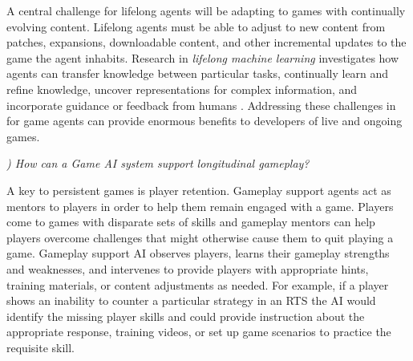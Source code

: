 \documentclass[conference]{IEEEtran}
\newcounter{questionno}
\newcommand{\subsubsectionx}[1]{{\em {\arabic{questionno}) #1}}
	\addtocounter{questionno}{1}
	}
\begin{document}

A central challenge for lifelong agents will be adapting to games with continually evolving content. 
Lifelong agents must be able to adjust to new content from patches, expansions, downloadable content, and other incremental updates to the game the agent inhabits.
Research in {\em lifelong machine learning} investigates how agents can transfer knowledge between particular tasks, continually learn and refine knowledge, uncover representations for complex information, and incorporate guidance or feedback from humans \cite{silver2013:lifelong-ml}.
Addressing these challenges in for game agents can provide enormous benefits to developers of live and ongoing games.


\subsubsectionx{How can a Game AI system support longitudinal gameplay?}
%
A key to persistent games is player retention.
Gameplay support agents act as mentors to players in order to help them remain engaged with a game. Players come to games with disparate sets of skills and gameplay mentors can help players overcome challenges that might otherwise cause them to quit playing a game. Gameplay support AI observes players, learns their gameplay strengths and weaknesses, and intervenes to provide players with appropriate hints, training materials, or content adjustments as needed. 
For example, if a player shows an inability to counter a particular strategy in an RTS the AI would identify the missing player skills and could provide instruction about the appropriate response, training videos, or set up game scenarios to practice the requisite skill. 

\end{document}
